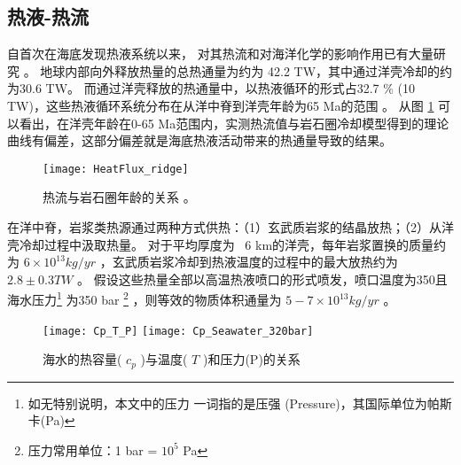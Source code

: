 \subsection{热液-热流}  %
自首次在海底发现热液系统以来，
对其热流和对海洋化学的影响作用已有大量研究 \citep{edmond1979ridge,elderfield1996mid,stein1994constraints,schultz1997controls,german2006hydrothermal} 。
地球内部向外释放热量的总热通量为约为 42.2 TW，其中通过洋壳冷却的约为30.6 TW。
而通过洋壳释放的热通量中，以热液循环的形式占32.7 \% (10 TW)，这些热液循环系统分布在从洋中脊到洋壳年龄为65 Ma的范围 \cite{stein1994constraints} 。
从图 \ref{fig:HeatFlux_ridge} 可以看出，在洋壳年龄在0-65 Ma范围内，实测热流值与岩石圈冷却模型得到的理论曲线有偏差，这部分偏差就是海底热液活动带来的热通量导致的结果。

\begin{figure} [htbp]
	\centering%
	\texttt{[image: HeatFlux\_ridge]} 
	\caption[热流与岩石圈年龄的关系]{热流与岩石圈年龄的关系 \citep{LOWELL2014} 。} 
	\label{fig:HeatFlux_ridge} 
\end{figure} 

在洋中脊，岩浆类热源通过两种方式供热：（1）玄武质岩浆的结晶放热；（2）从洋壳冷却过程中汲取热量。
对于平均厚度为~ 6 km的洋壳，每年岩浆置换的质量约为  $ 6\times 10^{13}  kg/yr $ ，玄武质岩浆冷却到热液温度的过程中的最大放热约为  $ 2.8 \pm 0.3 TW $   \citep{elderfield1996mid,german2006hydrothermal} 。
假设这些热量全部以高温热液喷口的形式喷发，喷口温度为350\ssd 且海水压力\footnote{如无特别说明，本文中的{压力} 一词指的是{压强}  (Pressure)，其国际单位为帕斯卡(Pa)} 为350 bar \footnote{压力常用单位：1 bar =  $ 10^5 $  Pa} ，则等效的物质体积通量为  $ 5-7 \times 10^{13}  kg/yr $ 。

\begin{figure} [htbp]
	\centering%
	{\texttt{[image: Cp\_T\_P]} }  
	\hspace{0.05\textwidth} 
	{\texttt{[image: Cp\_Seawater\_320bar]} } 
	\caption[海水的热容量与温度、压力的关系]{海水的热容量( $ c_p $ )与温度( $ T $ )和压力(P)的关系} 
	\label{fig:Cp_Seawater} 
\end{figure} 

